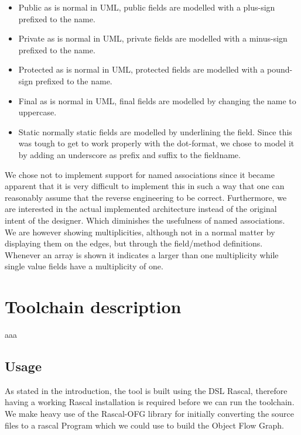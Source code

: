 \documentclass[a4paper,twoside,11pt]{article}
\begin{document}
\begin{itemize}
\item {\sc Public} as is normal in UML, public fields are modelled with a plus-sign prefixed to the name. 
\item {\sc Private} as is normal in UML, private fields are modelled with a minus-sign prefixed to the name.
\item {\sc Protected} as is normal in UML, protected fields are modelled with a pound-sign prefixed to the name.
\item {\sc Final} as is normal in UML, final fields are modelled by changing the name to uppercase.
\item {\sc Static} normally static fields are modelled by underlining the field. Since this was tough to get to work properly with the dot-format, we chose to model it by adding an underscore as prefix and suffix to the fieldname.
\end{itemize}

We chose not to implement support for named associations since it became apparent that it is very difficult to implement this in such a way that one can reasonably assume that the reverse engineering to be correct. Furthermore, we are interested in the actual implemented architecture instead of the original intent of the designer. Which diminishes the usefulness of named associations.\\

We are however showing multiplicities, although not in a normal matter by displaying them on the edges, but through the field/method definitions. Whenever an array is shown it indicates a larger than one multiplicity while single value fields have a multiplicity of one. \\


\section{Toolchain description}
\label{sec:tooldescription}
aaa

\subsection{Usage}
As stated in the introduction, the tool is built using the DSL Rascal, therefore having a working Rascal installation is required before we can run the toolchain. We make heavy use of the Rascal-OFG\cite{url:rascalofg} library for initially converting the source files to a rascal {\sc Program} which we could use to build the Object Flow Graph. \\
\end{document}
